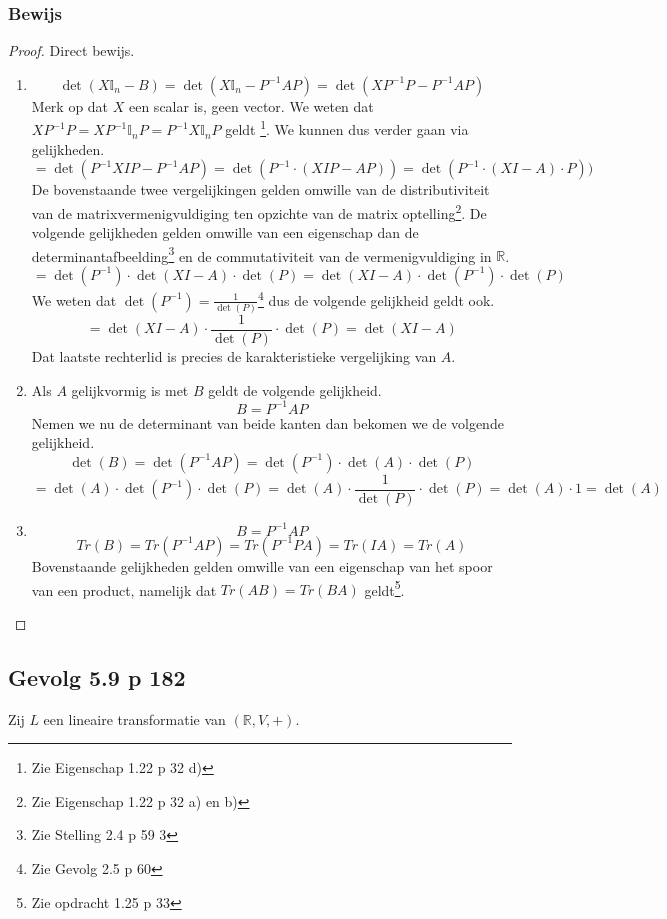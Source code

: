 \documentclass[lineaire_algebra_oplossingen.tex]{subfiles}
\begin{document}
\subsubsection*{Bewijs}
\begin{proof}
Direct bewijs.
\begin{enumerate}
\item 
\[
\det(X\mathbb{I}_n - B) = \det(X\mathbb{I}_n - P^{-1}AP) = \det(XP^{-1}P - P^{-1}AP)
\]
Merk op dat $X$ een scalar is, geen vector.
We weten dat $XP^{-1}P = XP^{-1}\mathbb{I}_nP=P^{-1}X\mathbb{I}_nP$ geldt \footnote{Zie Eigenschap 1.22 p 32 d)}. We kunnen dus verder gaan via gelijkheden.
\[
= \det(P^{-1} XI P - P^{-1}AP) = \det(P^{-1}\cdot ( XI P - AP)) = \det(P^{-1}\cdot ( XI- A) \cdot P))
\]
De bovenstaande twee vergelijkingen gelden omwille van de distributiviteit van de matrixvermenigvuldiging ten opzichte van de matrix optelling\footnote{Zie Eigenschap 1.22 p 32 a) en b)}. De volgende gelijkheden gelden omwille van een eigenschap dan de determinantafbeelding\footnote{Zie Stelling 2.4 p 59 3} en de commutativiteit van de vermenigvuldiging in $\mathbb{R}$.
\[
=\det(P^{-1})\cdot \det( XI- A)\cdot \det(P) =\det( XI- A)\cdot \det(P^{-1}) \cdot \det(P)
\]
We weten dat $\det( P^{-1}) = \frac{1}{\det(P)}$\footnote{Zie Gevolg 2.5 p 60} dus de volgende gelijkheid geldt ook.
\[
=\det( XI- A)\cdot \frac{1}{\det(P)}\cdot \det(P) = \det( XI- A)
\]
Dat laatste rechterlid is precies de karakteristieke vergelijking van $A$.

\item
Als $A$ gelijkvormig is met $B$ geldt de volgende gelijkheid.
\[
B = P^{-1}AP
\]
Nemen we nu de determinant van beide kanten dan bekomen we de volgende gelijkheid.
\[
\det(B) = \det(P^{-1}AP) = \det(P^{-1})\cdot \det(A)\cdot \det(P)
\]
\[
= \det(A)\cdot \det(P^{-1})\cdot \det(P) = \det(A)\cdot \frac{1}{\det(P)}\cdot \det(P) = \det(A) \cdot 1 = \det(A)
\]

\item
\[
B = P^{-1}AP 
\]
\[
Tr(B) = Tr(P^{-1}A P) = Tr(P^{-1}P A) = Tr(IA) = Tr(A)
\]
Bovenstaande gelijkheden gelden omwille van een eigenschap van het spoor van een product, namelijk dat $Tr(AB) = Tr(BA)$ geldt\footnote{Zie opdracht 1.25 p 33}.
\end{enumerate}
\end{proof}


\subsection{Gevolg 5.9 p 182}
\label{5.9}
Zij $L$ een lineaire transformatie van $(\mathbb{R},V,+)$.
\end{document}
